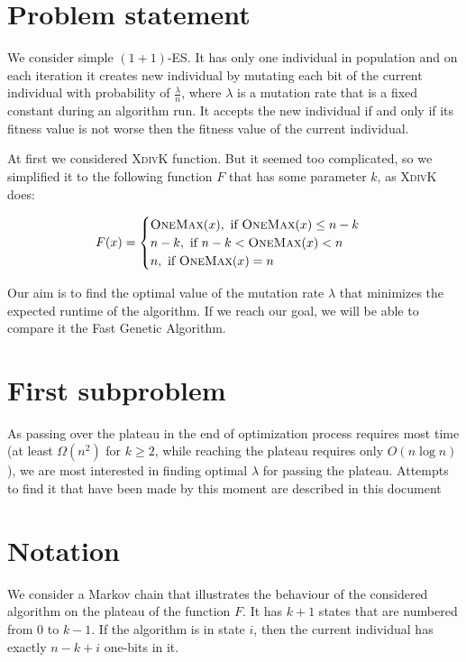 \documentclass{article}
\newcommand{\OM}{\textsc{OneMax}\xspace}
\newcommand{\XdK}{\textsc{XdivK}\xspace}
\begin{document}
\section{Problem statement}

We consider simple $(1 + 1)$-ES. It has only one individual in population and on each iteration it creates new individual by mutating each bit of the current individual with probability of $\frac{\lambda}{n}$, where $\lambda$ is a mutation rate that is a fixed constant during an algorithm run. It accepts the new individual if and only if its fitness value is not worse then the fitness value of the current individual.

At first we considered \XdK function. But it seemed too complicated, so we simplified it to the following function $F$ that has some parameter $k$, as \XdK does:

\begin{align*}
  F(x) =
  \begin{cases}
    \OM(x), \text{ if } \OM(x) \le n - k \\
    n - k, \text{ if } n - k < \OM(x) < n \\
    n, \text{ if } \OM(x) = n \\
  \end{cases}
\end{align*}

Our aim is to find the optimal value of the mutation rate $\lambda$ that minimizes the expected runtime of the algorithm. If we reach our goal, we will be able to compare it the Fast Genetic Algorithm.

\section{First subproblem}
As passing over the plateau in the end of optimization process requires most time (at least $\Omega(n^2)$ for $k \ge 2$, while reaching the plateau requires only $O(n \log n)$), we are most interested in finding optimal $\lambda$ for passing the plateau. Attempts to find it that have been made by this moment are described in this document

\section{Notation}

We consider a Markov chain that illustrates the behaviour of the considered algorithm on the plateau of the function $F$. It has $k + 1$ states that are numbered from $0$ to $k - 1$. If the algorithm is in state $i$, then the current individual has exactly $n - k + i$ one-bits in it. 
\end{document}
